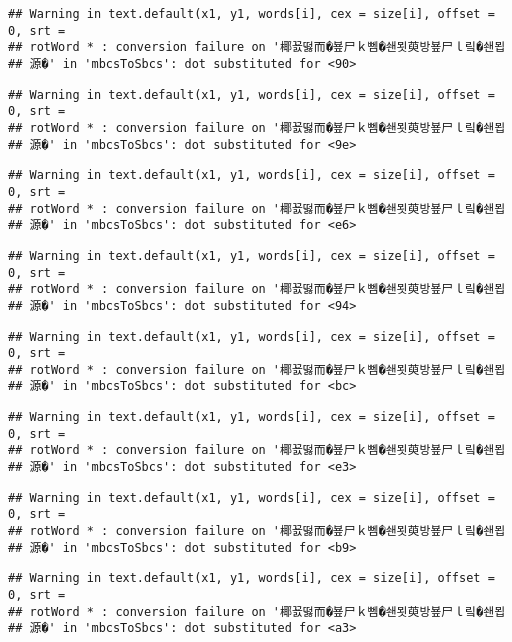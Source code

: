 \documentclass[]{article}
\begin{document}
\begin{verbatim}
## Warning in text.default(x1, y1, words[i], cex = size[i], offset = 0, srt =
## rotWord * : conversion failure on '椰꾨떯而�뵾尸ｋ뻼�쇈묏萸방뵾尸ｌ맄�쇈묍
## 源�' in 'mbcsToSbcs': dot substituted for <90>
\end{verbatim}

\begin{verbatim}
## Warning in text.default(x1, y1, words[i], cex = size[i], offset = 0, srt =
## rotWord * : conversion failure on '椰꾨떯而�뵾尸ｋ뻼�쇈묏萸방뵾尸ｌ맄�쇈묍
## 源�' in 'mbcsToSbcs': dot substituted for <9e>
\end{verbatim}

\begin{verbatim}
## Warning in text.default(x1, y1, words[i], cex = size[i], offset = 0, srt =
## rotWord * : conversion failure on '椰꾨떯而�뵾尸ｋ뻼�쇈묏萸방뵾尸ｌ맄�쇈묍
## 源�' in 'mbcsToSbcs': dot substituted for <e6>
\end{verbatim}

\begin{verbatim}
## Warning in text.default(x1, y1, words[i], cex = size[i], offset = 0, srt =
## rotWord * : conversion failure on '椰꾨떯而�뵾尸ｋ뻼�쇈묏萸방뵾尸ｌ맄�쇈묍
## 源�' in 'mbcsToSbcs': dot substituted for <94>
\end{verbatim}

\begin{verbatim}
## Warning in text.default(x1, y1, words[i], cex = size[i], offset = 0, srt =
## rotWord * : conversion failure on '椰꾨떯而�뵾尸ｋ뻼�쇈묏萸방뵾尸ｌ맄�쇈묍
## 源�' in 'mbcsToSbcs': dot substituted for <bc>
\end{verbatim}

\begin{verbatim}
## Warning in text.default(x1, y1, words[i], cex = size[i], offset = 0, srt =
## rotWord * : conversion failure on '椰꾨떯而�뵾尸ｋ뻼�쇈묏萸방뵾尸ｌ맄�쇈묍
## 源�' in 'mbcsToSbcs': dot substituted for <e3>
\end{verbatim}

\begin{verbatim}
## Warning in text.default(x1, y1, words[i], cex = size[i], offset = 0, srt =
## rotWord * : conversion failure on '椰꾨떯而�뵾尸ｋ뻼�쇈묏萸방뵾尸ｌ맄�쇈묍
## 源�' in 'mbcsToSbcs': dot substituted for <b9>
\end{verbatim}

\begin{verbatim}
## Warning in text.default(x1, y1, words[i], cex = size[i], offset = 0, srt =
## rotWord * : conversion failure on '椰꾨떯而�뵾尸ｋ뻼�쇈묏萸방뵾尸ｌ맄�쇈묍
## 源�' in 'mbcsToSbcs': dot substituted for <a3>
\end{verbatim}
\end{document}
